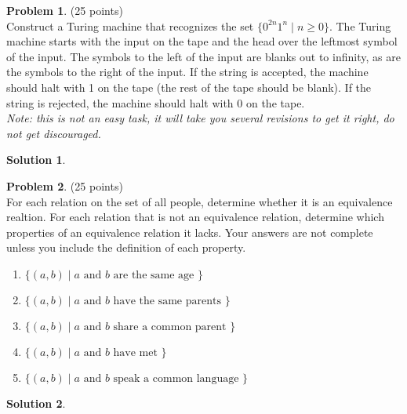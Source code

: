 \documentclass{article}
\theoremstyle{definition}
\newtheorem{problem}{Problem}
\newtheorem*{solution}{Solution}
\begin{document}
\begin{problem} (25 points)\\
Construct a Turing machine that recognizes the set $\{0^{2n}1^n \mid n\geq 0\}$.  The Turing machine starts with the input on the tape and the head over the leftmost symbol of the input.  The symbols to the left of the input are blanks out to infinity, as are the symbols to the right of the input.  If the string is accepted, the machine should halt with 1 on the tape (the rest of the tape should be blank).  If the string is rejected, the machine should halt with 0 on the tape.\\
\textit{Note: this is not an easy task, it will take you several revisions to get it right, do not get discouraged.}
\end{problem}

\begin{solution}\ \\

\end{solution}

\newpage

\begin{problem} (25 points)\\
For each relation on the set of all people, determine whether it is an equivalence realtion.  For each relation that is not an equivalence relation, determine which properties of an equivalence relation it lacks.  Your answers are not complete unless you include the definition of each property.
\begin{enumerate}
\item $\{(a,b) \mid a \text{ and } b \text{ are the same age }\}$
\item $\{(a,b) \mid a \text{ and } b \text{ have the same parents }\}$
\item $\{(a,b) \mid a \text{ and } b \text{ share a common parent }\}$
\item $\{(a,b) \mid a \text{ and } b \text{ have met }\}$
\item $\{(a,b) \mid a \text{ and } b \text{ speak a common language }\}$
\end{enumerate}
\end{problem}

\begin{solution}\ \\

\end{solution}

\newpage
\end{document}
